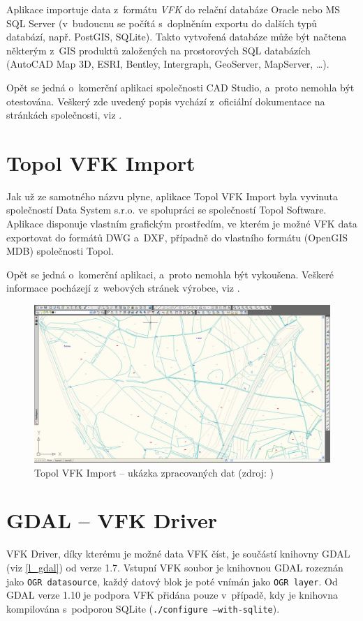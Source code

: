 \documentclass[a4paper,12pt,oneside]{book}
\begin{document}
Aplikace importuje data z~formátu \textit{VFK} do relační databáze
Oracle nebo MS SQL Server (v~budoucnu se počítá s~doplněním exportu do
dalších typů databází, např. PostGIS, SQLite). Takto vytvořená
databáze může být načtena některým z~GIS produktů založených na
prostorových SQL databázích (AutoCAD Map 3D, ESRI, Bentley,
Intergraph, GeoServer, MapServer, \dots).

Opět se jedná o~komerční aplikaci společnosti CAD Studio, a~proto
nemohla být otestována. Veškerý zde uvedený popis vychází z~oficiální
dokumentace na stránkách společnosti, viz \cite{cadstudio-vfk2db}.

\section{Topol VFK Import}
Jak už ze samotného názvu plyne, aplikace Topol VFK Import byla
vyvinuta společností Data System s.r.o. ve spolupráci se společností
Topol Software. Aplikace disponuje vlastním grafickým prostředím, ve
kterém je možné VFK data exportovat do formátů DWG a~DXF, případně do
vlastního formátu (OpenGIS MDB) společnosti Topol.

Opět se jedná o~komerční aplikaci, a~proto nemohla být
vykoušena. Veškeré informace pocházejí z~webových stránek výrobce, viz
\cite{topol_vfk_import}.

\begin{figure}[htb]
\centering
\includegraphics[width=\textwidth]{images/topol-aplikace.png}
\caption[Topol VFK Import -- ukázka zpracovaných dat]{Topol VFK Import -- ukázka zpracovaných dat (zdroj: \cite{topol_vfk_import})}
\end{figure}

\newpage
\section{GDAL -- VFK Driver}
\label{l_gdal_vfk_driver}
VFK Driver, díky kterému je možné data VFK číst, je součástí knihovny
GDAL (viz \ref{l_gdal}) od verze 1.7. Vstupní VFK soubor je knihovnou
GDAL rozeznán jako \texttt{OGR datasource}, každý datový blok je poté
vnímán jako \texttt{OGR layer}. Od GDAL verze 1.10 je podpora VFK
přidána pouze v~případě, kdy je knihovna kompilována s~podporou SQLite
(\texttt{./configure --with-sqlite}).
\end{document}
